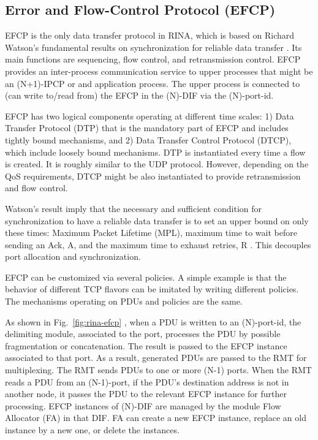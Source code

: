 \documentclass{ieeeaccess}
\begin{document}
\subsection{Error and Flow-Control Protocol (EFCP)}
EFCP is the only data transfer protocol in RINA, which is based on Richard Watson's fundamental results on synchronization for reliable data transfer \cite{watson1981timer}. Its main functions are sequencing, flow control, and retransmission control. EFCP provides an inter-process communication service to upper processes that might be an (N+1)-IPCP or and application process. The upper process is connected to (can write to/read from) the EFCP in the (N)-DIF via the (N)-port-id.

EFCP has two logical components operating at different time scales: 1) Data Transfer Protocol (DTP) that is the mandatory part of EFCP and includes tightly bound mechanisms, and 2) Data Transfer Control Protocol (DTCP), which include loosely bound mechanisms. DTP is instantiated every time a flow is created. It is roughly similar to the UDP protocol. However, depending on the QoS requirements, DTCP might be also instantiated to provide retransmission and flow control.

Watson's result imply that the necessary and sufficient condition for synchronization to have a reliable data transfer is to set an upper bound on only these times: Maximum Packet Lifetime (MPL), maximum time to wait before sending an Ack, A, and the maximum time to exhaust retries, R \cite{watson1981timer}. This decouples port allocation and synchronization.

EFCP can be customized via several policies. A simple example is that the behavior of different TCP flavors can be imitated by writing different policies. The mechanisms operating on PDUs and policies are the same.

As shown in Fig.~\ref{fig:rina-efcp} , when a PDU is written to an (N)-port-id, the delimiting module, associated to the port, processes the PDU by possible fragmentation or concatenation. The result is passed to the EFCP instance associated to that port. As a result, generated PDUs are passed to the RMT for multiplexing. The RMT sends PDUs to one or more (N-1) ports. When the RMT reads a PDU from an (N-1)-port, if the PDU's destination address is not in another node, it passes the PDU to the relevant EFCP instance for further processing. EFCP instances of (N)-DIF are managed by the module Flow Allocator (FA) in that DIF. FA can create a new EFCP instance, replace an old instance by a new one, or delete the instances.
\end{document}
